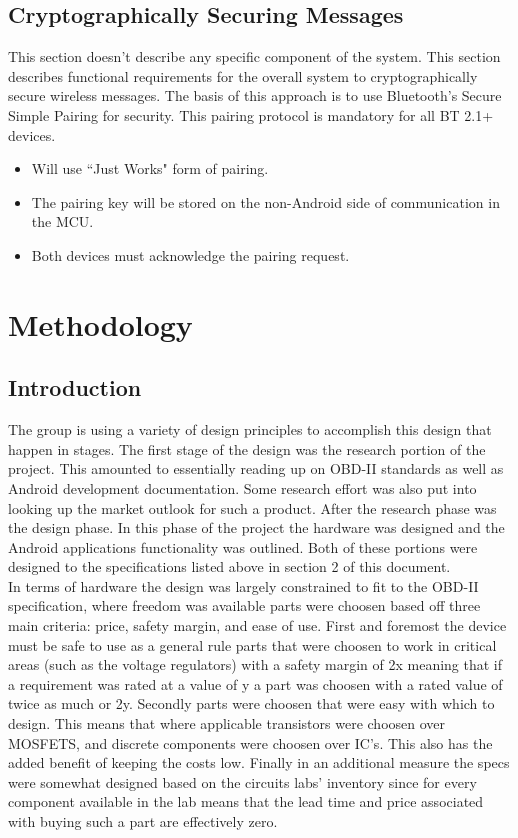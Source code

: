 \documentclass[12pt,letterpaper]{article}
\begin{document}
\subsection{Cryptographically Securing Messages}
This section doesn't describe any specific component of the system. This section describes functional requirements for the overall system to cryptographically secure wireless messages. The basis of this approach is to use Bluetooth's Secure Simple Pairing for security. This pairing protocol is mandatory for all BT 2.1+ devices.

\begin{itemize}
	\item Will use ``Just Works" form of pairing.
	\item The pairing key will be stored on the non-Android side of communication in the MCU.
	\item Both devices must acknowledge the pairing request.
\end{itemize}

\section{Methodology}
\subsection{Introduction}
The group is using a variety of design principles to accomplish this design that happen in stages. The first stage of the design was the research portion of the project. This amounted to essentially reading up on OBD-II standards as well as Android development documentation. Some research effort was also put into looking up the market outlook for such a product. After the research phase was the design phase. In this phase of the project the hardware was designed and the Android applications functionality was outlined. Both of these portions were designed to the specifications listed above in section 2 of this document. \\

In terms of hardware the design was largely constrained to fit to the OBD-II specification, where freedom was available parts were choosen based off three main criteria: price, safety margin, and ease of use. First and foremost the device must be safe to use as a general rule parts that were choosen to work in critical areas (such as the voltage regulators) with a safety margin of 2x meaning that if a requirement was rated at a value of y a part was choosen with a rated value of twice as much or 2y. Secondly parts were choosen that were easy with which to design. This means that where applicable transistors were choosen over MOSFETS, and discrete components were choosen over IC's. This also has the added benefit of keeping the costs low. Finally in an additional measure the specs were somewhat designed based on the circuits labs' inventory since for every component available in the lab means that the lead time and price associated with buying such a part are effectively zero. \\
\end{document}
